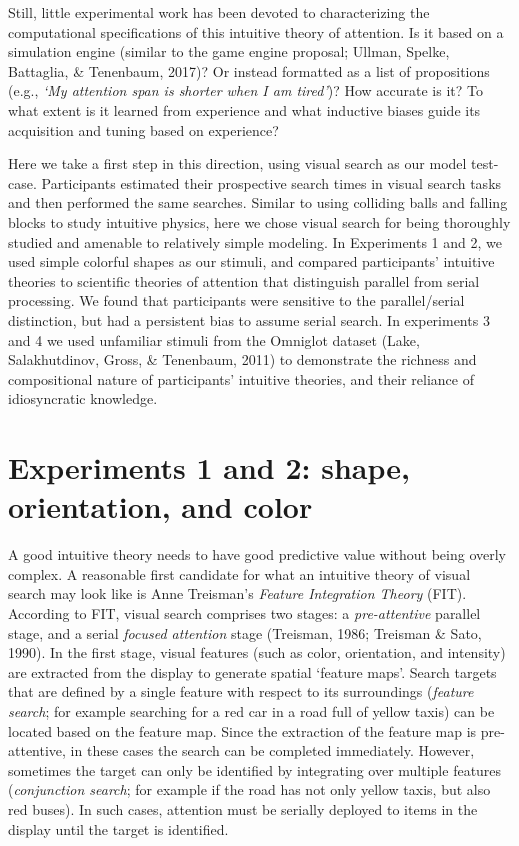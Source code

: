 \documentclass[12pt,twoside]{reedthesis}
\begin{document}
Still, little experimental work has been devoted to characterizing the computational specifications of this intuitive theory of attention. Is it based on a simulation engine (similar to the game engine proposal; Ullman, Spelke, Battaglia, \& Tenenbaum, 2017)? Or instead formatted as a list of propositions (e.g., \emph{`My attention span is shorter when I am tired'})? How accurate is it? To what extent is it learned from experience and what inductive biases guide its acquisition and tuning based on experience?

Here we take a first step in this direction, using visual search as our model test-case. Participants estimated their prospective search times in visual search tasks and then performed the same searches. Similar to using colliding balls and falling blocks to study intuitive physics, here we chose visual search for being thoroughly studied and amenable to relatively simple modeling. In Experiments 1 and 2, we used simple colorful shapes as our stimuli, and compared participants' intuitive theories to scientific theories of attention that distinguish parallel from serial processing. We found that participants were sensitive to the parallel/serial distinction, but had a persistent bias to assume serial search. In experiments 3 and 4 we used unfamiliar stimuli from the Omniglot dataset (Lake, Salakhutdinov, Gross, \& Tenenbaum, 2011) to demonstrate the richness and compositional nature of participants' intuitive theories, and their reliance of idiosyncratic knowledge.

\hypertarget{experiments-1-and-2-shape-orientation-and-color}{%
\section{Experiments 1 and 2: shape, orientation, and color}\label{experiments-1-and-2-shape-orientation-and-color}}

A good intuitive theory needs to have good predictive value without being overly complex. A reasonable first candidate for what an intuitive theory of visual search may look like is Anne Treisman's \emph{Feature Integration Theory} (FIT). According to FIT, visual search comprises two stages: a \emph{pre-attentive} parallel stage, and a serial \emph{focused attention} stage (Treisman, 1986; Treisman \& Sato, 1990). In the first stage, visual features (such as color, orientation, and intensity) are extracted from the display to generate spatial `feature maps'. Search targets that are defined by a single feature with respect to its surroundings (\emph{feature search}; for example searching for a red car in a road full of yellow taxis) can be located based on the feature map. Since the extraction of the feature map is pre-attentive, in these cases the search can be completed immediately. However, sometimes the target can only be identified by integrating over multiple features (\emph{conjunction search}; for example if the road has not only yellow taxis, but also red buses). In such cases, attention must be serially deployed to items in the display until the target is identified.
\end{document}
